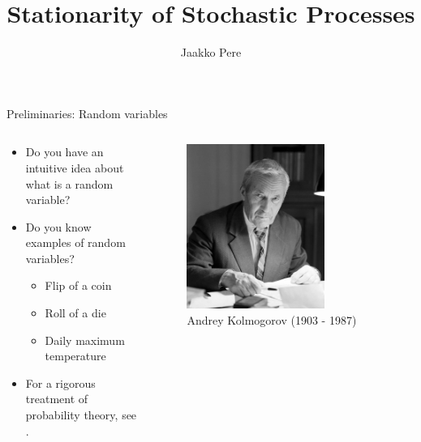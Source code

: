 \documentclass{beamer}
\title{Stationarity of Stochastic Processes}
\author{Jaakko Pere}
\date{\DTMdisplaydate{2023}{11}{06}{-1}}
\begin{document}
\frame{\titlepage}


\begin{frame}{Preliminaries: Random variables}
  \begin{columns}
    \begin{column}{0.47\textwidth}
        \begin{itemize}
          \item Do you have an intuitive idea about what is a random variable?
          \item Do you know examples of random variables?
          \pause
          \begin{itemize}
            \item Flip of a coin
            \pause
            \item Roll of a die
            \pause
            \item Daily maximum temperature
          \end{itemize}
          \pause
          \item For a rigorous treatment of probability theory, see
          \parencite{kallenberg1997}.
        \end{itemize}
    \end{column}
    \begin{column}{0.5\textwidth}
        \begin{figure}
          \centering
          \includegraphics[width=0.7\textwidth, height=0.85\textwidth]{kolmogorov.jpeg}
          \caption{Andrey Kolmogorov (1903 - 1987)}
        \end{figure}
    \end{column}
\end{columns}
\end{frame}
\end{document}
